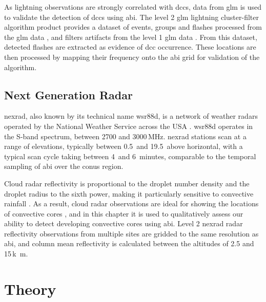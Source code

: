 As lightning observations are strongly correlated with \acrshort{dcc}s, data from \acrshort{glm} is used to validate the detection of \acrshort{dcc}s using \acrshort{abi}.
The level 2 \acrshort{glm} lightning cluster-filter algorithm product provides a dataset of events, groups and flashes processed from the \acrshort{glm} data \citep{peterson_research_2019}, and filters artifacts from the level 1 \acrshort{glm} data \citep{peterson_removing_2020}.
From this dataset, detected flashes are extracted as evidence of \acrshort{dcc} occurrence.
These locations are then processed by mapping their frequency onto the \acrshort{abi} grid for validation of the algorithm.

\subsection{Next Generation Radar}

\acrshort{nexrad}, also known by its technical name \acrfull{wsr88d}, is a network of weather radars operated by the National Weather Service across the USA \citep{crum_wsr-88d_1993}.
\acrshort{wsr88d} operates in the S-band spectrum, between 2700 and 3000\,\unit{MHz}.
\acrshort{nexrad} stations scan at a range of elevations, typically between 0.5\textdegree\ and 19.5\textdegree\ above horizontal, with a typical scan cycle taking between 4\, and 6~minutes, comparable to the temporal sampling of \acrshort{abi} over the \acrshort{conus} region.

Cloud radar reflectivity is proportional to the droplet number density and the droplet radius to the sixth power, making it particularly sensitive to convective rainfall \citep{yau_short_1989}.
As a result, cloud radar observations are ideal for showing the locations of convective cores \citep{austin_relation_1987, rosenfeld_general_1993, zipser_vertical_1994}, and in this chapter it is used to qualitatively assess our ability to detect developing convective cores using \acrshort{abi}.
Level 2 \acrshort{nexrad} radar reflectivity observations from multiple sites are gridded to the same resolution as \acrshort{abi}, and column mean reflectivity is calculated between the altitudes of 2.5 and 15\,\unit{k m}.

\section{Theory} \label{sec:detection_theory}

